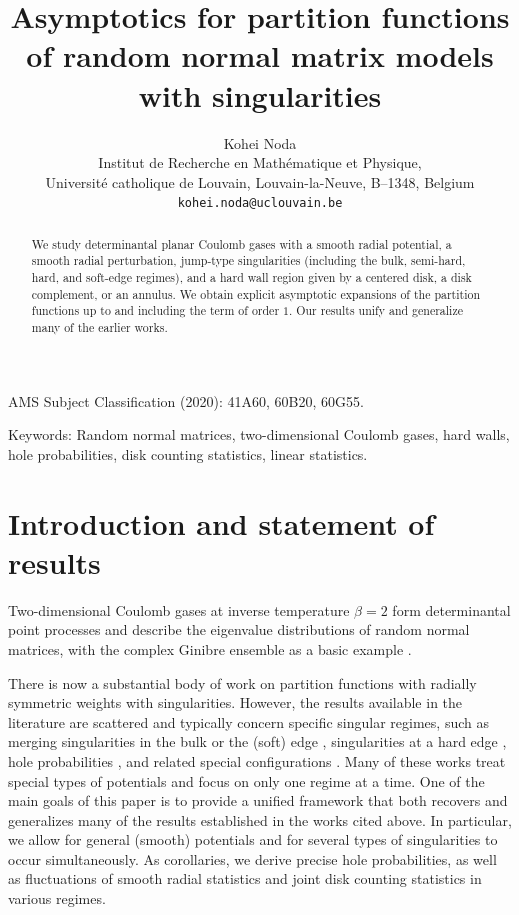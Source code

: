 \documentclass[a4paper]{article}
\title{Asymptotics for partition functions of random normal matrix models with singularities}
\author{
Kohei Noda\\[2mm]
\small Institut de Recherche en Math\'ematique et Physique,\\
\small Universit\'e catholique de Louvain, Louvain-la-Neuve, B--1348, Belgium\\
\small \texttt{kohei.noda@uclouvain.be}
}
\date{}
\numberwithin{equation}{section}
\begin{document}
\maketitle

\begin{abstract}
We study determinantal planar Coulomb gases with a smooth radial potential, a smooth radial perturbation, jump-type singularities (including the bulk, semi-hard, hard, and soft-edge regimes),
and a hard wall region given by a centered disk, a disk complement, or
an annulus.  We obtain explicit asymptotic expansions of the partition functions up to and including the term of order $1$. Our results unify and generalize many of the earlier works.
\end{abstract}

\noindent
{\small{\sc AMS Subject Classification (2020)}: 41A60, 60B20, 60G55.}

\noindent
{\small{\sc Keywords}: Random normal matrices, two-dimensional Coulomb gases, hard walls, hole probabilities, disk counting statistics, linear statistics.}


\section{Introduction and statement of results}\label{section: introduction}

Two-dimensional Coulomb gases at inverse temperature $\beta=2$ form determinantal point processes and describe the eigenvalue distributions of random normal matrices, with the complex Ginibre ensemble as a basic example \cite{Ginibre,Forrester,BFreview}. %

There is now a substantial body of work on partition functions with radially symmetric weights with singularities. However, the results available in the literature are scattered and typically concern specific singular regimes, such as merging singularities in the bulk or the (soft) edge \cite{ABE2023,ABES2023,BC2022,C2021 FH,CL2023,FenzlLambert,L et al 2019 b,MMO25,Noda2025,CMV2016}, singularities at a hard edge \cite{ACCL1,ACCL2,C2021}, hole probabilities \cite{AFLS25,ForresterHoleProba,L et al 2019,SF2026}, and related special configurations \cite{ACC2023c,BKS2023}. Many of these works treat special types of potentials and focus on only one regime at a time. One of the main goals of this paper is to provide a unified framework that both recovers and generalizes many of the results established in the works cited above. In particular, we allow for general (smooth) potentials and for several types of singularities to occur simultaneously. As corollaries, we derive precise hole probabilities, as well as fluctuations of smooth radial statistics and joint disk counting statistics in various regimes.
\end{document}
